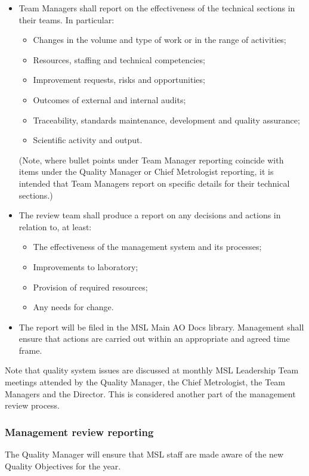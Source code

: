 \begin{itemize}
\item Team Managers shall report on the effectiveness of the technical sections in their teams. In particular: 
\begin{itemize}
\item Changes in the volume and type of work or in the range of activities;
\item Resources, staffing and technical competencies;
\item Improvement requests, risks and opportunities;
\item Outcomes of external and internal audits;
\item Traceability, standards maintenance, development and quality assurance;
\item Scientific activity and output.
\end{itemize}
(Note, where bullet points under Team Manager reporting coincide with items under the Quality Manager or Chief Metrologist reporting, it is intended that Team Managers report on specific details for their technical sections.) 
\item The review team shall produce a report on any decisions and actions in relation to, at least:
\begin{itemize}
\item The effectiveness of the management system and its processes;
\item Improvements to laboratory;
\item Provision of required resources;
\item Any needs for change.
\end{itemize}
\item The report will be filed in the MSL Main AO Docs library. Management shall ensure that actions are carried out within an appropriate and agreed time frame.
\end{itemize}

Note that quality system issues are discussed at monthly MSL Leadership Team meetings attended by the Quality Manager, the Chief Metrologist, the Team Managers and the Director. This is considered another part of the management review process.
\subsubsection{Management review reporting}
The Quality Manager will ensure that MSL staff are made aware of the new Quality Objectives for the year.